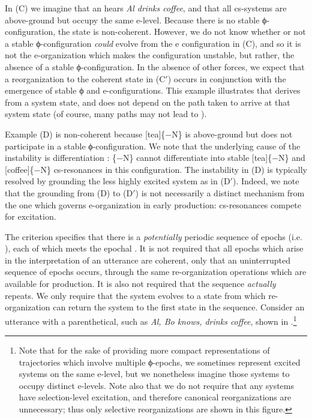   In (C) we imagine that an  hears \textit{Al drinks coffee}, and that all cs-sys\-tems are above-ground but occupy the same e-level. Because there is no stable ϕ-con\-fi\-gu\-ra\-tion, the state is non-coherent. However, we do not know whether or not a stable ϕ-con\-fi\-gu\-ra\-tion \textit{could} evolve from the e configuration in (C), and so it is not the e-or\-ga\-ni\-za\-tion which makes the configuration unstable, but rather, the absence of a stable ϕ-con\-fi\-gu\-ra\-tion. In the absence of other forces, we expect that a reorganization to the coherent state in (C$'$) occurs in conjunction with the emergence of stable ϕ and e-con\-fi\-gu\-ra\-tions. This example illustrates that  derives from a system state, and does not depend on the path taken to arrive at that system state (of course, many paths may not lead to ). 

  Example (D) is non-coherent because [tea]\{−N\} is above-ground but does not participate in a stable ϕ-con\-fi\-gu\-ra\-tion. We note that the underlying cause of the instability is differentiation : \{−N\} cannot differentiate into stable [tea]\{−N\} and [coffee]\{−N\} cs-resonances in this configuration. The instability in (D) is typically resolved by grounding the less highly excited system as in (D$'$). Indeed, we note that the grounding from (D) to (D$'$) is not necessarily a distinct mechanism from the one which governs e-or\-ga\-ni\-za\-tion in early production: cs-resonances compete for excitation.

The  criterion specifies that there is a \textit{potentially} periodic sequence of epochs (i.e. ), each of which meets the epochal . It is not required that all epochs which arise in the interpretation of an utterance are coherent, only that an uninterrupted sequence of epochs occurs, through the same re-or\-ga\-ni\-za\-tion operations which are available for production. It is also not required that the sequence \textit{actually} repeats. We only require that the  system evolves to a state from which re-or\-ga\-ni\-za\-tion can return the system to the first state in the sequence. Consider an utterance with a parenthetical, such as \textit{Al, Bo knows, drinks coffee}, shown in {}.\footnote{Note that for the sake of providing more compact representations of trajectories which involve multiple ϕ-epochs, we sometimes represent excited systems on the same e-level, but we nonetheless imagine those systems to occupy distinct e-levels. Note also that we do not require that any systems have selection-level excitation, and therefore canonical reorganizations are unnecessary; thus only selective reorganizations are shown in this figure.}

